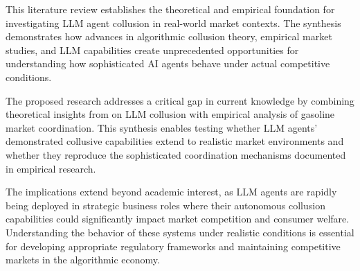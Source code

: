 This literature review establishes the theoretical and empirical foundation for investigating LLM agent collusion in real-world market contexts. The synthesis demonstrates how advances in algorithmic collusion theory, empirical market studies, and LLM capabilities create unprecedented opportunities for understanding how sophisticated AI agents behave under actual competitive conditions.

The proposed research addresses a critical gap in current knowledge by combining theoretical insights from \textcite{fish_algorithmic_2025} on LLM collusion with \textcite{byrne_learning_2019} empirical analysis of gasoline market coordination. This synthesis enables testing whether LLM agents' demonstrated collusive capabilities extend to realistic market environments and whether they reproduce the sophisticated coordination mechanisms documented in empirical research.

The implications extend beyond academic interest, as LLM agents are rapidly being deployed in strategic business roles where their autonomous collusion capabilities could significantly impact market competition and consumer welfare. Understanding the behavior of these systems under realistic conditions is essential for developing appropriate regulatory frameworks and maintaining competitive markets in the algorithmic economy.